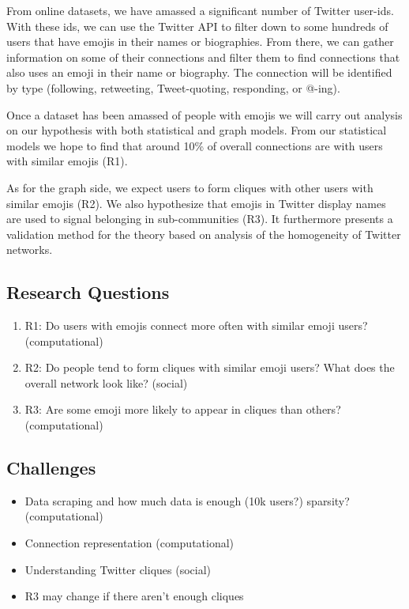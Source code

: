 \documentclass[manuscript, authordraft]{acmart}
\begin{document}
From online datasets, we have amassed a significant number of Twitter
user-ids. With these ids, we can use the Twitter API to filter down to
some hundreds of users that have emojis in their names or
biographies. From there, we can gather information on some of their
connections and filter them to find connections that also uses an
emoji in their name or biography. The connection will be identified by
type (following, retweeting, Tweet-quoting, responding, or @-ing).

Once a dataset has been amassed of people with emojis we will carry
out analysis on our hypothesis with both statistical and graph
models. From our statistical models we hope to find that around 10\%
of overall connections are with users with similar emojis (R1).

As for the graph side, we expect users to form cliques with other
users with similar emojis (R2). We also hypothesize that emojis in
Twitter display names are used to signal belonging in sub-communities
(R3). It furthermore presents a validation method for the theory based
on analysis of the homogeneity of Twitter networks.

\subsection{Research Questions}

\begin{enumerate}
\item R1: Do users with emojis connect more often with similar emoji users? (computational)
\item R2: Do people tend to form cliques with similar emoji users? What does the overall network look like? (social)
\item R3: Are some emoji more likely to appear in cliques than others? (computational)
\end{enumerate}

\subsection{Challenges}

\begin{itemize}
\item Data scraping and how much data is enough (10k users?) sparsity?
  (computational)
\item Connection representation (computational)
\item Understanding Twitter cliques (social)
\item R3 may change if there aren’t enough cliques
\end{itemize}




\end{document}
